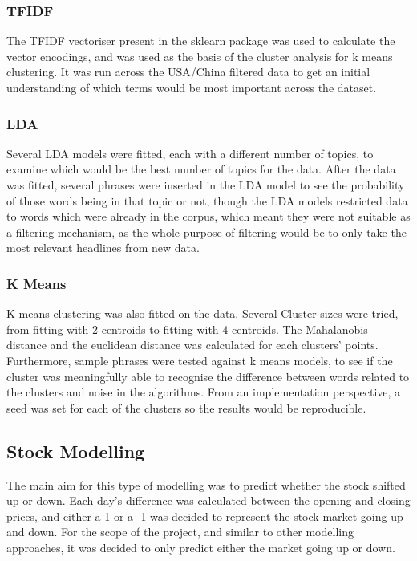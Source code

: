 \subsubsection{TFIDF}
The TFIDF vectoriser present in the sklearn package was used to calculate the vector encodings, and was used as the basis of the cluster analysis for k means clustering. It was run across the USA/China filtered data to get an initial understanding of which terms would be most important across the dataset.

\subsubsection{LDA}
Several LDA models were fitted, each with a different number of topics, to examine which would be the best number of topics for the data. After the data was fitted, several phrases were inserted in the LDA model to see the probability of those words being in that topic or not, though the LDA models restricted data to words which were already in the corpus, which meant they were not suitable as a filtering mechanism, as the whole purpose of filtering would be to only take the most relevant headlines from new data.

\subsubsection{K Means}
K means clustering was also fitted on the data. Several Cluster sizes were tried, from fitting with 2 centroids to fitting with 4 centroids. The Mahalanobis distance and the euclidean distance was calculated for each clusters' points. Furthermore, sample phrases were tested against k means models, to see if the cluster was meaningfully able to recognise the difference between words related to the clusters and noise in the algorithms. From an implementation perspective, a seed was set for each of the clusters so the results would be reproducible. 
\subsection{Stock Modelling}

The main aim for this type of modelling was to predict whether the stock shifted up or down. Each day's difference was calculated between the opening and closing prices, and either a 1 or a -1 was decided to represent the stock market going up and down. For the scope of the project, and similar to other modelling approaches, it was decided to only predict either the market going up or down.

